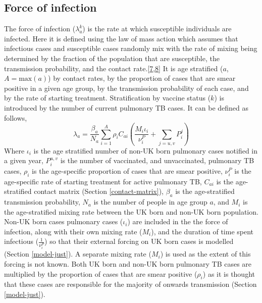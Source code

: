 \documentclass[11pt,twoside]{bristolthesis}
\begin{document}
  \hypertarget{force-of-infection}{%
  \subsection{Force of infection}\label{force-of-infection}}
  
  The force of infection (\(\lambda^k_a\)) is the rate at which susceptible individuals are infected. Here it is defined using the law of mass action which assumes that infectious cases and susceptible cases randomly mix with the rate of mixing being determined by the fraction of the population that are susceptible, the transmission probability, and the contact rate.{[}\protect\hyperlink{ref-Anderson1991}{7},\protect\hyperlink{ref-Keeling2007}{8}{]} It is age stratified (\(a\), \(A = \text{max}(a)\)) by contact rates, by the proportion of cases that are smear positive in a given age group, by the transmission probability of each case, and by the rate of starting treatment. Stratification by vaccine status (\(k\)) is introduced by the number of current pulmonary TB cases. It can be defined as follows,
  \begin{equation}
  \lambda_a = \frac{\beta_a}{N_a} \sum\limits_{i=1}^{A} \rho_i C_{ai}\left(\frac{M_{i}\iota_i}{\nu_i^P} + \sum\limits_{j = u,v}P^j_i\right)
    \label{eq:force-of-infection}
  \end{equation}
  Where \(\iota_i\) is the age stratified number of non-UK born pulmonary cases notified in a given year, \(P^{u,v}_i\) is the number of vaccinated, and unvaccinated, pulmonary TB cases, \(\rho_i\) is the age-specific proportion of cases that are smear positive, \(\nu^P_i\) is the age-specific rate of starting treatment for active pulmonary TB, \(C_{ai}\) is the age-stratified contact matrix (Section \ref{contact-matrix}), \(\beta_a\) is the age-stratified transmission probability, \(N_a\) is the number of people in age group \(a\), and \(M_i\) is the age-stratified mixing rate between the UK born and non-UK born population. Non-UK born cases pulmonary cases (\(\iota_i\)) are included in the the force of infection, along with their own mixing rate (\(M_i\)), and the duration of time spent infectious (\(\frac{1}{\nu^P_i}\)) so that their external forcing on UK born cases is modelled (Section \ref{model-just}). A separate mixing rate (\(M_i\)) is used as the extent of this forcing is not known. Both UK born and non-UK born pulmonary TB cases are multiplied by the proportion of cases that are smear positive (\(\rho_i\)) as it is thought that these cases are responsible for the majority of onwards transmission (Section \ref{model-just}).
  
\end{document}
